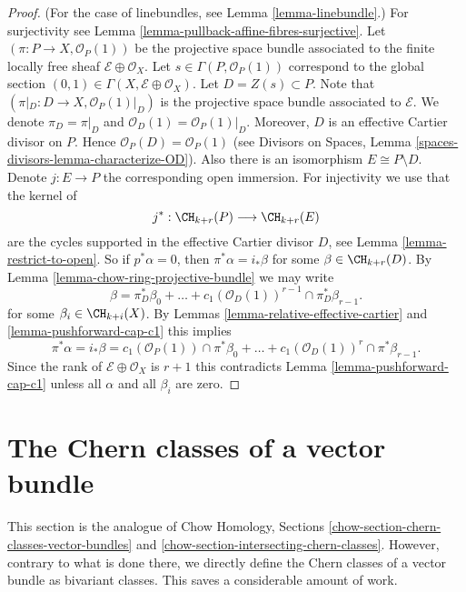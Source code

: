 \begin{proof}
(For the case of linebundles, see Lemma \ref{lemma-linebundle}.)
For surjectivity see Lemma \ref{lemma-pullback-affine-fibres-surjective}.
Let $(\pi  : P \to X, \mathcal{O}_P(1))$
be the projective space bundle associated
to the finite locally free sheaf $\mathcal{E} \oplus \mathcal{O}_X$.
Let $s \in \Gamma(P, \mathcal{O}_P(1))$ correspond to the global
section $(0, 1) \in \Gamma(X, \mathcal{E} \oplus \mathcal{O}_X)$.
Let $D = Z(s) \subset P$. Note that
$(\pi|_D : D \to X , \mathcal{O}_P(1)|_D)$
is the projective space bundle associated
to $\mathcal{E}$. We denote $\pi_D = \pi|_D$ and
$\mathcal{O}_D(1) = \mathcal{O}_P(1)|_D$.
Moreover, $D$ is an effective
Cartier divisor on $P$. Hence $\mathcal{O}_P(D) = \mathcal{O}_P(1)$
(see Divisors on Spaces, Lemma \ref{spaces-divisors-lemma-characterize-OD}).
Also there is an isomorphism
$E \cong P \setminus D$. Denote $j : E \to P$ the
corresponding open immersion.
For injectivity we use that the kernel of
$$
j^* :
\CH_{k + r}(P)
\longrightarrow
\CH_{k + r}(E)
$$
are the cycles supported in the effective Cartier divisor $D$,
see Lemma \ref{lemma-restrict-to-open}. So if $p^*\alpha = 0$, then
$\pi^*\alpha = i_*\beta$ for some $\beta \in \CH_{k + r}(D)$.
By Lemma \ref{lemma-chow-ring-projective-bundle} we may write
$$
\beta = \pi_D^*\beta_0 +
\ldots + c_1(\mathcal{O}_D(1))^{r - 1} \cap \pi_D^* \beta_{r - 1}.
$$
for some $\beta_i \in \CH_{k + i}(X)$.
By Lemmas \ref{lemma-relative-effective-cartier}
and \ref{lemma-pushforward-cap-c1}
this implies
$$
\pi^*\alpha = i_*\beta =
c_1(\mathcal{O}_P(1)) \cap \pi^*\beta_0 +
\ldots +
c_1(\mathcal{O}_D(1))^r \cap \pi^*\beta_{r - 1}.
$$
Since the rank of $\mathcal{E} \oplus \mathcal{O}_X$ is $r + 1$
this contradicts Lemma \ref{lemma-pushforward-cap-c1} unless all
$\alpha$ and all $\beta_i$ are zero.
\end{proof}








\section{The Chern classes of a vector bundle}
\label{section-chern-classes-vector-bundles}

\noindent
This section is the analogue of Chow Homology, Sections
\ref{chow-section-chern-classes-vector-bundles} and
\ref{chow-section-intersecting-chern-classes}.
However, contrary to what is done there, we directly
define the Chern classes of a vector bundle as bivariant classes.
This saves a considerable amount of work.

